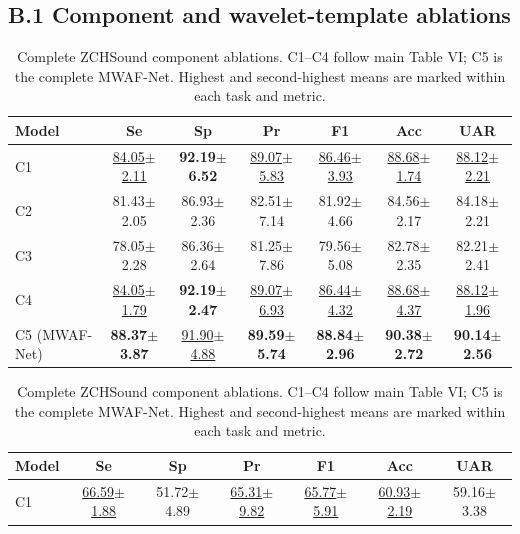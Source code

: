 \subsection*{B.1 Component and wavelet-template ablations}

\begin{table}[H]
\centering\color{black}
\caption{Complete ZCHSound component ablations. C1--C4 follow main Table VI; C5 is the complete MWAF-Net. Highest and second-highest means are marked within each task and metric.}\label{tab:supp_components}
\label{tab:supp_original_ablation_binary}
\label{tab:supp_original_ablation_five}
\begingroup
\fontsize{8.5}{10}\selectfont
\setlength{\tabcolsep}{6pt}\renewcommand{\arraystretch}{1.04}
\begin{tabular*}{\linewidth}{@{\extracolsep{\fill}}lcccccc@{}}\toprule
\textbf{Model} & \textbf{Se} & \textbf{Sp} & \textbf{Pr} & \textbf{F1} & \textbf{Acc} & \textbf{UAR}\\\midrule
C1 & \underline{84.05$\pm$2.11} & \textbf{92.19$\pm$6.52} & \underline{89.07$\pm$5.83} & \underline{86.46$\pm$3.93} & \underline{88.68$\pm$1.74} & \underline{88.12$\pm$2.21}\\
C2 & 81.43$\pm$2.05 & 86.93$\pm$2.36 & 82.51$\pm$7.14 & 81.92$\pm$4.66 & 84.56$\pm$2.17 & 84.18$\pm$2.21\\
C3 & 78.05$\pm$2.28 & 86.36$\pm$2.64 & 81.25$\pm$7.86 & 79.56$\pm$5.08 & 82.78$\pm$2.35 & 82.21$\pm$2.41\\
C4 & \underline{84.05$\pm$1.79} & \textbf{92.19$\pm$2.47} & \underline{89.07$\pm$6.93} & \underline{86.44$\pm$4.32} & \underline{88.68$\pm$4.37} & \underline{88.12$\pm$1.96}\\
C5 (MWAF-Net) & \textbf{88.37$\pm$3.87} & \underline{91.90$\pm$4.88} & \textbf{89.59$\pm$5.74} & \textbf{88.84$\pm$2.96} & \textbf{90.38$\pm$2.72} & \textbf{90.14$\pm$2.56}\\
\bottomrule\end{tabular*}
\endgroup
{}
\begingroup
\fontsize{8.5}{10}\selectfont
\setlength{\tabcolsep}{6pt}\renewcommand{\arraystretch}{1.04}
\begin{tabular*}{\linewidth}{@{\extracolsep{\fill}}lcccccc@{}}\toprule
\textbf{Model} & \textbf{Se} & \textbf{Sp} & \textbf{Pr} & \textbf{F1} & \textbf{Acc} & \textbf{UAR}\\\midrule
C1 & \underline{66.59$\pm$1.88} & 51.72$\pm$4.89 & \underline{65.31$\pm$9.82} & \underline{65.77$\pm$5.91} & \underline{60.93$\pm$2.19} & 59.16$\pm$3.38\\

\end{tabular*}
\end{table}
